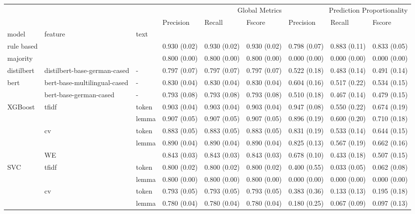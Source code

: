 \begin{tabular}{lllllllll}
 &  &  & \multicolumn{3}{r}{Global Metrics} & \multicolumn{3}{r}{Prediction Proportionality} \\
 &  &  & Precision & Recall & Fscore & Precision & Recall & Fscore \\
model & feature & text &  &  &  &  &  &  \\
rule based &  &  & 0.930 (0.02) & 0.930 (0.02) & 0.930 (0.02) & 0.798 (0.07) & 0.883 (0.11) & 0.833 (0.05) \\
majority &  &  & 0.800 (0.00) & 0.800 (0.00) & 0.800 (0.00) & 0.000 (0.00) & 0.000 (0.00) & 0.000 (0.00) \\
distilbert & distilbert-base-german-cased & - & 0.797 (0.07) & 0.797 (0.07) & 0.797 (0.07) & 0.522 (0.18) & 0.483 (0.14) & 0.491 (0.14) \\
\multirow[c]{2}{*}{bert} & bert-base-multilingual-cased & - & 0.830 (0.04) & 0.830 (0.04) & 0.830 (0.04) & 0.604 (0.16) & 0.517 (0.22) & 0.534 (0.15) \\
 & bert-base-german-cased & - & 0.793 (0.08) & 0.793 (0.08) & 0.793 (0.08) & 0.510 (0.18) & 0.467 (0.14) & 0.479 (0.15) \\
\multirow[c]{5}{*}{XGBoost} & \multirow[c]{2}{*}{tfidf} & token & 0.903 (0.04) & 0.903 (0.04) & 0.903 (0.04) & 0.947 (0.08) & 0.550 (0.22) & 0.674 (0.19) \\
 &  & lemma & 0.907 (0.05) & 0.907 (0.05) & 0.907 (0.05) & 0.896 (0.19) & 0.600 (0.20) & 0.710 (0.18) \\
 & \multirow[c]{2}{*}{cv} & token & 0.883 (0.05) & 0.883 (0.05) & 0.883 (0.05) & 0.831 (0.19) & 0.533 (0.14) & 0.644 (0.15) \\
 &  & lemma & 0.890 (0.04) & 0.890 (0.04) & 0.890 (0.04) & 0.825 (0.13) & 0.567 (0.19) & 0.662 (0.16) \\
 & WE &  & 0.843 (0.03) & 0.843 (0.03) & 0.843 (0.03) & 0.678 (0.10) & 0.433 (0.18) & 0.507 (0.15) \\
\multirow[c]{5}{*}{SVC} & \multirow[c]{2}{*}{tfidf} & token & 0.800 (0.02) & 0.800 (0.02) & 0.800 (0.02) & 0.400 (0.55) & 0.033 (0.05) & 0.062 (0.08) \\
 &  & lemma & 0.800 (0.00) & 0.800 (0.00) & 0.800 (0.00) & 0.000 (0.00) & 0.000 (0.00) & 0.000 (0.00) \\
 & \multirow[c]{2}{*}{cv} & token & 0.793 (0.05) & 0.793 (0.05) & 0.793 (0.05) & 0.383 (0.36) & 0.133 (0.13) & 0.195 (0.18) \\
 &  & lemma & 0.780 (0.04) & 0.780 (0.04) & 0.780 (0.04) & 0.180 (0.25) & 0.067 (0.09) & 0.097 (0.13) \\

\end{tabular}
